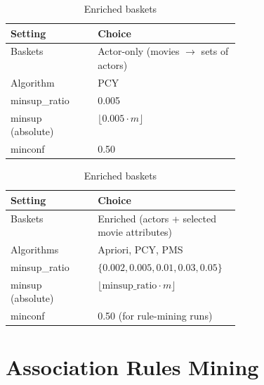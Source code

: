\documentclass{article}  %
\begin{document}
\begin{table}[!htbp]
    \caption{Final Configurations for Association Rule Mining}
    \centering
    \normalsize
    \setlength{\tabcolsep}{4pt}
    \renewcommand{\arraystretch}{1.1}

    \begin{subtable}[t]{0.48\textwidth}
        \centering
        \caption{ Actor-only baskets}
        \begin{tabularx}{\linewidth}{>{\raggedright\arraybackslash}p{0.38\linewidth}X}
            \toprule
            \textbf{Setting} & \textbf{Choice} \\
            \midrule
            Baskets & Actor-only (movies \(\rightarrow\) sets of actors) \\
            Algorithm & PCY \\
            minsup\_ratio & 0.005 \\
            minsup (absolute) & \(\lfloor 0.005 \cdot m \rfloor\) \\
            minconf & 0.50 \\
            \bottomrule
        \end{tabularx}
        \label{tab:config_actor_only}
    \end{subtable}
    \hfill
    \begin{subtable}[t]{0.48\textwidth}
        \centering
        \caption{Enriched baskets}
        \begin{tabularx}{\linewidth}{>{\raggedright\arraybackslash}p{0.38\linewidth}X}
            \toprule
            \textbf{Setting} & \textbf{Choice} \\
            \midrule
            Baskets & Enriched (actors + selected movie attributes) \\
            Algorithms & Apriori, PCY, PMS \\
            minsup\_ratio & \(\{0.002, 0.005, 0.01, 0.03, 0.05\}\) \\
            minsup (absolute) & \(\lfloor \text{minsup\_ratio}\cdot m \rfloor\) \\
            minconf & 0.50 (for rule-mining runs) \\
            \bottomrule
        \end{tabularx}
        \label{tab:16config_enriched}
    \end{subtable}
\end{table}

\section{Association Rules Mining}
\end{document}
